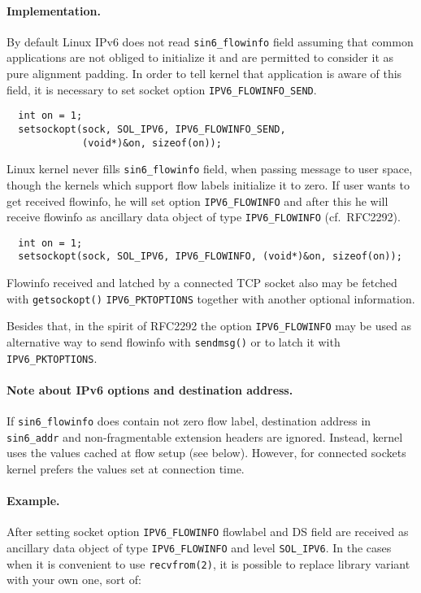 \paragraph{Implementation.}
By default Linux IPv6 does not read \verb|sin6_flowinfo| field
assuming that common applications are not obliged to initialize it
and are permitted to consider it as pure alignment padding.
In order to tell kernel that application
is aware of this field, it is necessary to set socket option
\verb|IPV6_FLOWINFO_SEND|.

\begin{verbatim}
  int on = 1;
  setsockopt(sock, SOL_IPV6, IPV6_FLOWINFO_SEND,
             (void*)&on, sizeof(on));
\end{verbatim}

Linux kernel never fills \verb|sin6_flowinfo| field, when passing
message to user space, though the kernels which support flow labels
initialize it to zero. If user wants to get received flowinfo, he
will set option \verb|IPV6_FLOWINFO| and after this he will receive
flowinfo as ancillary data object of type \verb|IPV6_FLOWINFO|
(cf.\ RFC2292).

\begin{verbatim}
  int on = 1;
  setsockopt(sock, SOL_IPV6, IPV6_FLOWINFO, (void*)&on, sizeof(on));
\end{verbatim}

Flowinfo received and latched by a connected TCP socket also may be fetched
with \verb|getsockopt()| \verb|IPV6_PKTOPTIONS| together with
another optional information.

Besides that, in the spirit of RFC2292 the option \verb|IPV6_FLOWINFO|
may be used as alternative way to send flowinfo with \verb|sendmsg()| or
to latch it with \verb|IPV6_PKTOPTIONS|.

\paragraph{Note about IPv6 options and destination address.}
If \verb|sin6_flowinfo| does contain not zero flow label,
destination address in \verb|sin6_addr| and non-fragmentable
extension headers are ignored. Instead, kernel uses the values
cached at flow setup (see below). However, for connected sockets
kernel prefers the values set at connection time.

\paragraph{Example.}
After setting socket option \verb|IPV6_FLOWINFO|
flowlabel and DS field are received as ancillary data object
of type \verb|IPV6_FLOWINFO| and level \verb|SOL_IPV6|.
In the cases when it is convenient to use \verb|recvfrom(2)|,
it is possible to replace library variant with your own one,
sort of:

